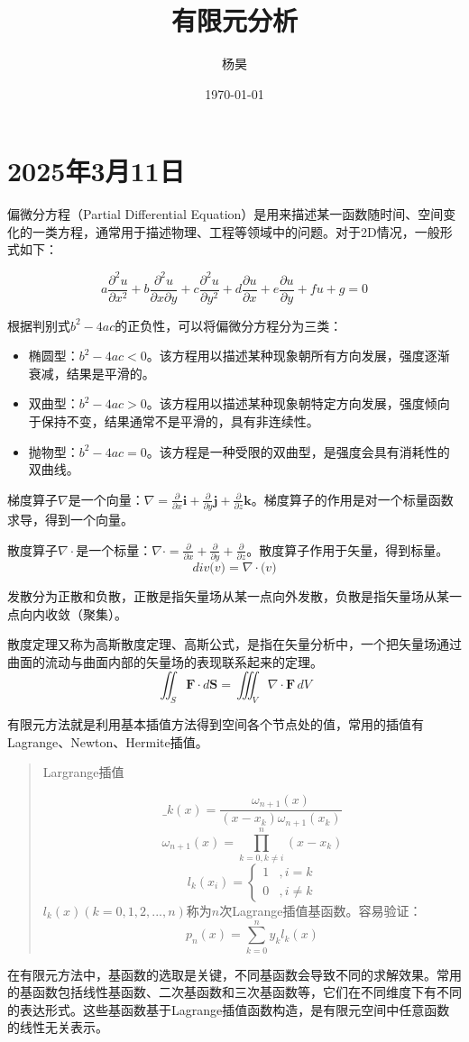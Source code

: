 \documentclass[12pt]{article}
\title{有限元分析}
\author{杨昊}
\date{\today}
\begin{document}
\maketitle
\thispagestyle{empty}  %

\newpage
\tableofcontents


\newpage

\section{2025年3月11日}
偏微分方程（Partial Differential Equation）是用来描述某一函数随时间、空间变化的一类方程，通常用于描述物理、工程等领域中的问题。对于2D情况，一般形式如下：

$$
 a \frac {\partial^2 u} {\partial x^2} + b \frac {\partial^2 u} {\partial x \partial y} + c \frac {\partial^2 u} {\partial y^2} + d \frac {\partial u} {\partial x} + e \frac {\partial u} {\partial y} + f u  + g= 0
$$

根据判别式$b^2 - 4ac$的正负性，可以将偏微分方程分为三类：
\begin{itemize}
    \item 椭圆型：$b^2 - 4ac < 0$。该方程用以描述某种现象朝所有方向发展，强度逐渐衰减，结果是平滑的。
    \item 双曲型：$b^2 - 4ac > 0$。该方程用以描述某种现象朝特定方向发展，强度倾向于保持不变，结果通常不是平滑的，具有非连续性。
    \item 抛物型：$b^2 - 4ac = 0$。该方程是一种受限的双曲型，是强度会具有消耗性的双曲线。
\end{itemize}
梯度算子$\nabla$是一个向量：$  \nabla = \frac{\partial}{\partial x} \mathbf{i} + \frac{\partial}{\partial y} \mathbf{j} + \frac{\partial}{\partial z} \mathbf{k}$。梯度算子的作用是对一个标量函数求导，得到一个向量。

散度算子$\nabla \cdot$是一个标量：$  \nabla \cdot = \frac{\partial}{\partial x} + \frac{\partial}{\partial y} + \frac{\partial}{\partial z}$。散度算子作用于矢量，得到标量。
$$
{div} \mathbf(v) = \nabla \cdot \mathbf(v)
$$

发散分为正散和负散，正散是指矢量场从某一点向外发散，负散是指矢量场从某一点向内收敛（聚集）。

散度定理又称为高斯散度定理、高斯公式，是指在矢量分析中，一个把矢量场通过曲面的流动与曲面内部的矢量场的表现联系起来的定理。
$$
\iint_{S} \mathbf{F} \cdot d\mathbf{S} = \iiint_{V} \nabla \cdot \mathbf{F} \, dV
$$

有限元方法就是利用基本插值方法得到空间各个节点处的值，常用的插值有Lagrange、Newton、Hermite插值。
\begin{quote}
    Largrange插值

    $$
    \_k(x) = \frac {\omega_{n+1}(x)} {(x - x_k)\omega_{n + 1}(x_k)}
    $$
    $$
    \omega_{n+1}(x) = \prod_{k = 0, k \neq i}^{n} (x - x_k)
    $$
    $$
    l_k(x_i) = \left\{ \begin{array}{ll}
        1 &, i = k \\
        0 &, i \neq k
        \end{array} \right.
    $$
    $l_k(x)(k = 0,1,2,...,n)$称为$n$次Lagrange插值基函数。容易验证：
    $$
    p_n(x) = \sum_{k=0}^{n}y_k l_k(x)
    $$
\end{quote}

在有限元方法中，基函数的选取是关键，不同基函数会导致不同的求解效果。常用的基函数包括线性基函数、二次基函数和三次基函数等，它们在不同维度下有不同的表达形式。这些基函数基于Lagrange插值函数构造，是有限元空间中任意函数的线性无关表示。
\end{document}
